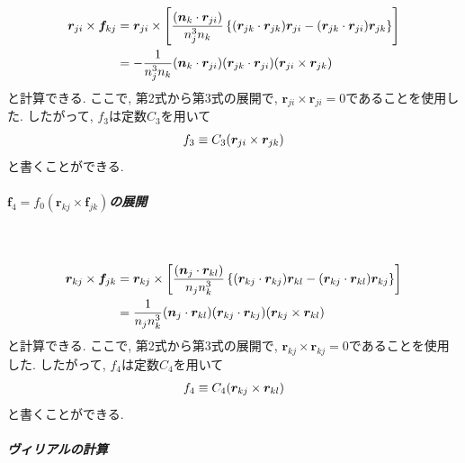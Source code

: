 \begin{align}
    \bm{r}_{ji} \times \bm{f}_{kj}
 &=
    \bm{r}_{ji} \times
    \left[
          \frac{(\bm{n}_{k} \cdot \bm{r}_{ji})}{n_{j}^{3}n_{k}}
          \left\{
                  (\bm{r}_{jk} \cdot \bm{r}_{jk}) \bm{r}_{ji}
                 -(\bm{r}_{jk} \cdot \bm{r}_{ji}) \bm{r}_{jk}
          \right\}
    \right]
 \notag
 \\
 &=
    - \frac{1}{n_{j}^{3}n_{k}}
    (\bm{n}_{k} \cdot \bm{r}_{ji})
    (\bm{r}_{jk} \cdot \bm{r}_{ji})
    (\bm{r}_{ji} \times \bm{r}_{jk})
 \notag
\end{align}
と計算できる. ここで, 第2式から第3式の展開で, $\bm{r}_{ji} \times \bm{r}_{ji} = 0$であることを使用した. 
したがって, $f_{3}$は定数$C_{3}$を用いて
\begin{align}
 f_{3} \equiv C_{3} (\bm{r}_{ji} \times \bm{r}_{jk})
 \notag
\end{align}
と書くことができる. 
\\

\subparagraph{$\bm{f}_{4} = f_{0} (\bm{r}_{kj} \times \bm{f}_{jk})$の展開} \

\begin{align}
    \bm{r}_{kj} \times \bm{f}_{jk}
 &=
    \bm{r}_{kj} \times
    \left[
          \frac{(\bm{n}_{j} \cdot \bm{r}_{kl})}{n_{j}n_{k}^{3}}
          \left\{
                  (\bm{r}_{kj} \cdot \bm{r}_{kj}) \bm{r}_{kl}
                 -(\bm{r}_{kj} \cdot \bm{r}_{kl}) \bm{r}_{kj}
          \right\}
    \right]
 \notag
 \\
 &=
    \frac{1}{n_{j}n_{k}^{3}}
    (\bm{n}_{j} \cdot \bm{r}_{kl})
    (\bm{r}_{kj} \cdot \bm{r}_{kj})
    (\bm{r}_{kj} \times \bm{r}_{kl})
 \notag
\end{align}
と計算できる. ここで, 第2式から第3式の展開で, $\bm{r}_{kj} \times \bm{r}_{kj} = 0$であることを使用した. 
したがって, $f_{4}$は定数$C_{4}$を用いて
\begin{align}
 f_{4} \equiv C_{4} (\bm{r}_{kj} \times \bm{r}_{kl})
 \notag
\end{align}
と書くことができる. 
\\

\subparagraph{ヴィリアルの計算} \

